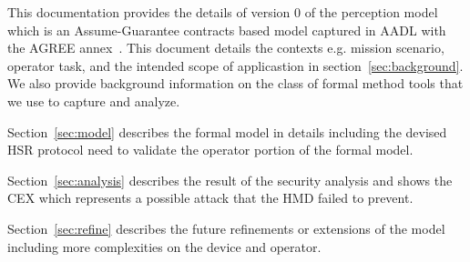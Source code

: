 
This documentation provides the details of version 0 of the perception model which is an Assume-Guarantee
contracts based model captured in AADL with the AGREE annex~\cite{}. This document details the contexts e.g. mission
scenario, operator task, and the intended scope of applicastion in section~\ref{sec:background}.  
We also provide background information on the class of formal method tools that we use to capture and analyze. 

Section~\ref{sec:model} describes the formal model in details including the devised HSR protocol need to validate 
the operator portion of the formal model. 

Section~\ref{sec:analysis} describes the result of the security analysis and shows the CEX which represents a 
possible attack that the HMD failed to prevent. 

Section~\ref{sec:refine} describes the future refinements or extensions of the model including more 
complexities on the device and operator. 






